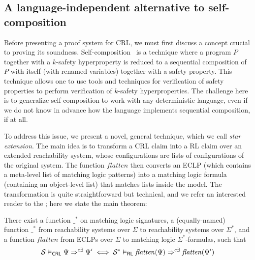 \subsection{A language-independent alternative to self-composition}
\label{sec:self-composition}




Before presenting a proof system for CRL, we must first discuss a concept
crucial to proving its soundness. Self-composition~\cite{BartheDR04,DarvasHS05}
is a technique where a program $P$ together with a $k$-safety hyperproperty is
reduced to a sequential composition of $P$ with itself (with renamed
variables) together with a safety property.  This technique allows one to use
tools and techniques for verification of safety properties to perform
verification of $k$-safety hyperproperties.  The challenge here is to
generalize self-composition to work with any deterministic language, even if
we do not know in advance how the language implements sequential composition,
if at all.

To address this issue, we present a novel, general technique, which we call
\emph{star extension}. The main idea is to transform a CRL claim into a RL
claim over an extended reachability system, whose configurations are lists of
configurations of the original system.  The function $\mathit{flatten}$ then
converts an ECLP (which contains a meta-level list of matching logic patterns)
into a matching logic formula (containing an object-level list) that matches
lists inside the model.  The transformation is quite straightforward but
technical, and we refer an interested reader to the
; here we state the main theorem:
\begin{theorem}\label{thm:CRLandRLcorrespondence}
  There exist a function $\_^*$ on matching logic signatures,
  a (equally-named) function $\_^*$ from reachability systems over $\Sigma$ to reachability systems over $\Sigma^*$,
  and a function $\mathit{flatten}$ from ECLPs over $\Sigma$ to matching logic $\Sigma^*$-formulas,
  such that
  \begin{equation*}
  \mathcal{S} \vDash_{\mathsf{CRL}} \Psi \Rightarrow^{c\exists} \Psi^\prime
    \iff \mathcal{S}^* \vDash_{\mathsf{RL}} \mathit{flatten}(\Psi) \Rightarrow^{c\exists} \mathit{flatten}(\Psi^\prime)
  \end{equation*}
\end{theorem}


